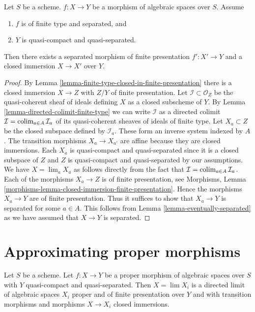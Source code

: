 \begin{proposition}
\label{proposition-separated-closed-in-finite-presentation}
Let $S$ be a scheme. $f : X \to Y$ be a morphism of algebraic spaces
over $S$. Assume
\begin{enumerate}
\item $f$ is of finite type and separated, and
\item $Y$ is quasi-compact and quasi-separated.
\end{enumerate}
Then there exists a separated morphism of finite presentation
$f' : X' \to Y$ and a closed immersion $X \to X'$ over $Y$.
\end{proposition}

\begin{proof}
By Lemma \ref{lemma-finite-type-closed-in-finite-presentation}
there is a closed immersion $X \to Z$ with $Z/Y$ of
finite presentation. Let $\mathcal{I} \subset \mathcal{O}_Z$
be the quasi-coherent sheaf of ideals defining $X$ as a closed
subscheme of $Y$. By
Lemma \ref{lemma-directed-colimit-finite-type}
we can write $\mathcal{I}$ as a directed colimit
$\mathcal{I} = \mathop{\mathrm{colim}}\nolimits_{a \in A} \mathcal{I}_a$ of its
quasi-coherent sheaves of ideals of finite type.
Let $X_a \subset Z$ be the closed subspace defined by $\mathcal{I}_a$.
These form an inverse system indexed by $A$.
The transition morphisms $X_a \to X_{a'}$ are affine because
they are closed immersions. Each $X_a$ is quasi-compact and quasi-separated
since it is a closed subspace of $Z$ and $Z$ is quasi-compact and
quasi-separated by our assumptions.
We have $X = \lim_a X_a$ as follows directly from the
fact that $\mathcal{I} = \mathop{\mathrm{colim}}\nolimits_{a \in A} \mathcal{I}_a$.
Each of the morphisms $X_a \to Z$ is of finite presentation, see
Morphisms, Lemma \ref{morphisms-lemma-closed-immersion-finite-presentation}.
Hence the morphisms $X_a \to Y$ are of finite presentation.
Thus it suffices to show that $X_a \to Y$ is separated for some
$a \in A$. This follows from Lemma \ref{lemma-eventually-separated}
as we have assumed that $X \to Y$ is separated.
\end{proof}






\section{Approximating proper morphisms}
\label{section-approximate-proper}

\begin{lemma}
\label{lemma-proper-limit-of-proper-finite-presentation}
Let $S$ be a scheme. Let $f : X \to Y$ be a proper morphism of algebraic
spaces over $S$ with $Y$ quasi-compact and quasi-separated. Then
$X = \lim X_i$ is a directed limit of algebraic spaces $X_i$
proper and of finite presentation over $Y$ and with transition
morphisms and morphisms $X \to X_i$ closed immersions.
\end{lemma}

